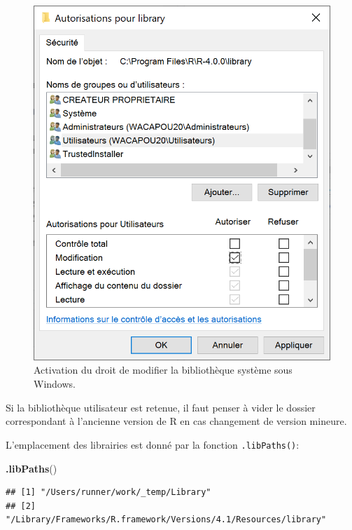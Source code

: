 \documentclass[
  12pt,
  french,
  a4paper,
  extrafontsizes,onecolumn,openright
  ]{memoir}
\newenvironment{Shaded}{\begin{snugshade}}{\end{snugshade}}
\newcommand{\KeywordTok}[1]{\textcolor[rgb]{0.13,0.29,0.53}{\textbf{#1}}}
\newcommand{\NormalTok}[1]{#1}
\begin{document}
\begin{figure}

{\centering \includegraphics[width=0.8\linewidth]{images/R-library} 

}

\caption{Activation du droit de modifier la bibliothèque système sous Windows.}\label{fig:R-library}
\end{figure}

\normalsize

Si la bibliothèque utilisateur est retenue, il faut penser à vider le dossier correspondant à l'ancienne version de R en cas changement de version mineure.

L'emplacement des librairies est donné par la fonction \texttt{.libPaths()}:

\scriptsize

\begin{Shaded}
\begin{Highlighting}[]
\KeywordTok{.libPaths}\NormalTok{()}
\end{Highlighting}
\end{Shaded}

\begin{verbatim}
## [1] "/Users/runner/work/_temp/Library"                              
## [2] "/Library/Frameworks/R.framework/Versions/4.1/Resources/library"
\end{verbatim}
\end{document}
